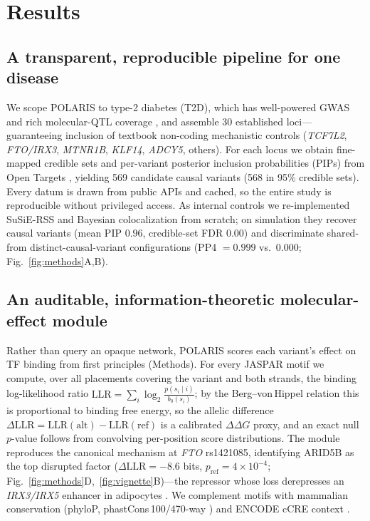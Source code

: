 \documentclass[10pt]{article}
\begin{document}
\section{Results}

\subsection{A transparent, reproducible pipeline for one disease}
We scope POLARIS to type-2 diabetes (T2D), which has well-powered GWAS \citep{mahajan2022diamante} and
rich molecular-QTL coverage \citep{gtex2020}, and assemble 30 established loci---guaranteeing inclusion
of textbook non-coding mechanistic controls (\emph{TCF7L2}, \emph{FTO/IRX3}, \emph{MTNR1B}, \emph{KLF14},
\emph{ADCY5}, others). For each locus we obtain fine-mapped credible sets and per-variant posterior
inclusion probabilities (PIPs) from Open Targets \citep{ochoa2023opentargets}, yielding 569 candidate
causal variants (568 in 95\% credible sets). Every datum is drawn from public APIs and cached, so the
entire study is reproducible without privileged access. As internal controls we re-implemented SuSiE-RSS
\citep{zou2022susierss} and Bayesian colocalization \citep{giambartolomei2014coloc} from scratch; on
simulation they recover causal variants (mean PIP $0.96$, credible-set FDR $0.00$) and discriminate
shared- from distinct-causal-variant configurations (PP4 $=0.999$ vs.\ $0.000$; Fig.~\ref{fig:methods}A,B).

\subsection{An auditable, information-theoretic molecular-effect module}
Rather than query an opaque network, POLARIS scores each variant's effect on TF binding from first
principles (Methods). For every JASPAR motif \citep{rauluseviciute2024jaspar} we compute, over all
placements covering the variant and both strands, the binding log-likelihood ratio
$\mathrm{LLR}=\sum_i \log_2 \tfrac{p(s_i\mid i)}{b_0(s_i)}$; by the Berg--von\,Hippel relation
\citep{berg1987statistical} this is proportional to binding free energy, so the allelic difference
$\Delta\mathrm{LLR}=\mathrm{LLR}(\text{alt})-\mathrm{LLR}(\text{ref})$ is a calibrated $\Delta\Delta G$
proxy, and an exact null $p$-value follows from convolving per-position score distributions. The
module reproduces the canonical mechanism at \emph{FTO} rs1421085, identifying ARID5B as the top
disrupted factor ($\Delta\mathrm{LLR}=-8.6$ bits, $p_{\text{ref}}=4\times10^{-4}$;
Fig.~\ref{fig:methods}D,~\ref{fig:vignette}B)---the repressor whose loss derepresses an \emph{IRX3/IRX5}
enhancer in adipocytes \citep{claussnitzer2015fto}. We complement motifs with mammalian conservation
(phyloP, phastCons\,100/470-way \citep{sullivan2023zoonomia}) and ENCODE cCRE context
\citep{moore2020encode}.
\end{document}
